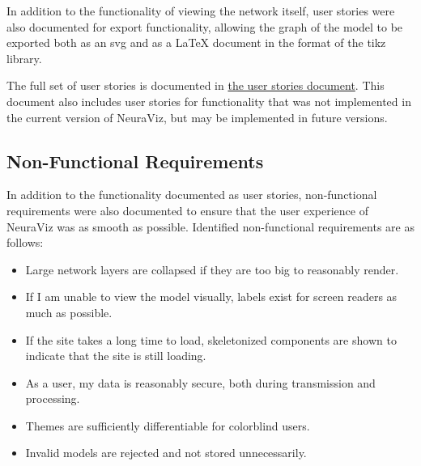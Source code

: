 In addition to the functionality of viewing the network itself, user stories were also documented for export functionality, allowing the graph of the model to be exported both as an svg and as a LaTeX document in the format of the tikz library. 

The full set of user stories is documented in \href{https://github.com/Bennett-Wendorf/NeuraViz/blob/main/docs/user_stories.md}{the user stories document}. This document also includes user stories for functionality that was not implemented in the current version of NeuraViz, but may be implemented in future versions.

\subsection{Non-Functional Requirements}
In addition to the functionality documented as user stories, non-functional requirements were also documented to ensure that the user experience of NeuraViz was as smooth as possible. Identified non-functional requirements are as follows:
\begin{itemize}
    \item Large network layers are collapsed if they are too big to reasonably render.
    \item If I am unable to view the model visually, labels exist for screen readers as much as possible.
    \item If the site takes a long time to load, skeletonized components are shown to indicate that the site is still loading.
    \item As a user, my data is reasonably secure, both during transmission and processing.
    \item Themes are sufficiently differentiable for colorblind users.
    \item Invalid models are rejected and not stored unnecessarily.
\end{itemize}
